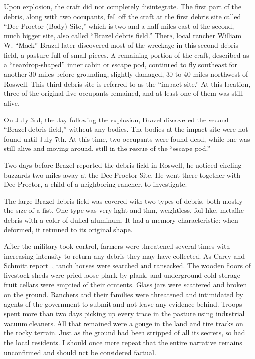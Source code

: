 Upon explosion, the craft did not completely disintegrate. The first part of the debris, along with two occupants, fell off the craft at the first debris site called ``Dee Proctor (Body) Site,'' which is two and a half miles east of the second, much bigger site, also called ``Brazel debris field.'' There, local rancher William W. ``Mack'' Brazel later discovered most of the wreckage in this second debris field, a pasture full of small pieces. A remaining portion of the craft, described as a ``teardrop-shaped'' inner cabin or escape pod, continued to fly southeast for another 30 miles before grounding, slightly damaged, 30 to 40 miles northwest of Roswell. This third debris site is referred to as the ``impact site.'' At this location, three of the original five occupants remained, and at least one of them was still alive.


On July 3rd, the day following the explosion, Brazel discovered the second ``Brazel debris field,'' without any bodies. The bodies at the impact site were not found until July 7th. At this time, two occupants were found dead, while one was still alive and moving around, still in the rescue of the ``escape pod.''

Two days before Brazel reported the debris field in Roswell, he noticed circling buzzards two miles away at the Dee Proctor Site. He went there together with Dee Proctor, a child of a neighboring rancher, to investigate.

The large Brazel debris field was covered with two types of debris, both mostly the size of a fist. One type was very light and thin, weightless, foil-like, metallic debris with a color of dulled aluminum. It had a memory characteristic: when deformed, it returned to its original shape.

After the military took control, farmers were threatened several times with increasing intensity to return any debris they may have collected. As Carey and Schmitt report~\cite{CareySchmitt}, ranch houses were searched and ransacked. The wooden floors of livestock sheds were pried loose plank by plank, and underground cold storage fruit cellars were emptied of their contents. Glass jars were scattered and broken on the ground. Ranchers and their families were threatened and intimidated by agents of the government to submit and not leave any evidence behind. Troops spent more than two days picking up every trace in the pasture using industrial vacuum cleaners. All that remained were a gouge in the land and tire tracks on the rocky terrain. Just as the ground had been stripped of all its secrets, so had the local residents. I should once more repeat that the entire narrative remains unconfirmed and should not be considered factual.


